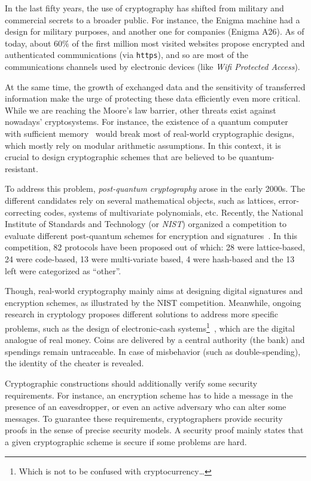 In the last fifty years, the use of cryptography has shifted from military and commercial secrets to a broader public.
For instance, the Enigma machine had a design for military purposes, and another one for companies (Enigma A26).
As of today, about $60\%$ of the first million most visited websites propose encrypted and authenticated communications (via \texttt{https}), and so are most of the communications channels used by electronic devices (like \textit{Wifi Protected Access}).

At the same time, the growth of exchanged data and the sensitivity of transferred information make the urge of protecting these data efficiently even more critical.
While we are reaching the Moore's law barrier, other threats exist against nowadays' cryptosystems.
For instance, the existence of a quantum computer with sufficient memory~\cite{Sho99} would break most of real-world cryptographic designs, which mostly rely on modular arithmetic assumptions.
In this context, it is crucial to design cryptographic schemes that are believed to be quantum-resistant.

To address this problem, \textit{post-quantum cryptography} arose in the early 2000s.
The different candidates rely on several mathematical objects, such as lattices, error-correcting codes, systems of multivariate polynomials, etc.
Recently, the National Institute of Standards and Technology (or \textit{NIST}) organized a competition to evaluate different post-quantum schemes for encryption and signatures~\cite{NIS17}.
In this competition, 82 protocols have been proposed out of which: 28 were lattice-based, 24 were code-based, 13 were multi-variate based, 4 were hash-based and the 13 left were categorized as ``other''.

Though, real-world cryptography mainly aims at designing digital signatures and encryption schemes, as illustrated by the NIST competition. 
Meanwhile, ongoing research in cryptology proposes different solutions to address more specific problems, such as the design of electronic-cash systems\footnote{Which is not to be confused with cryptocurrency\ldots}~\cite{CFN88}, which are the digital analogue of real money. Coins are delivered by a central authority (the bank) and spendings remain untraceable. In case of misbehavior (such as double-spending), the identity of the cheater is revealed.

Cryptographic constructions should additionally verify some security requirements.
For instance, an encryption scheme has to hide a message in the presence of an eavesdropper, or even an active adversary who can alter some messages.
To guarantee these requirements, cryptographers provide security proofs in the sense of precise security models.
A security proof mainly states that a given cryptographic scheme is secure if some problems are hard.

